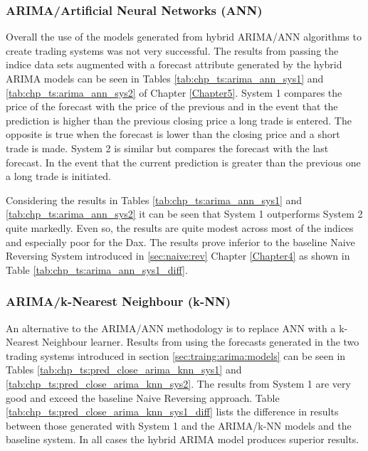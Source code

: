 \subsubsection{ARIMA/Artificial Neural Networks (ANN)}
Overall the use of the models generated from hybrid ARIMA/ANN algorithms to create trading systems was not very successful. The results from passing the indice data sets augmented with a forecast attribute generated by the hybrid ARIMA models can be seen in Tables  \ref{tab:chp_ts:arima_ann_sys1} and \ref{tab:chp_ts:arima_ann_sys2} of Chapter \ref{Chapter5}. System 1 compares the price of the forecast with the price of the previous and in the event that the prediction is higher than the previous closing price a long trade is entered. The opposite is true when the forecast is lower than the closing price and a short trade is made. System 2 is similar but compares the forecast with the last forecast. In the event that the current prediction is greater than the previous one a long trade is initiated.

Considering the results in Tables \ref{tab:chp_ts:arima_ann_sys1} and \ref{tab:chp_ts:arima_ann_sys2} it can be seen that System 1 outperforms System 2 quite markedly. Even so, the results are quite modest across most of the indices and especially poor for the Dax. The results prove inferior to the baseline Naive Reversing System introduced in \ref{sec:naive:rev} Chapter \ref{Chapter4} as shown in Table \ref{tab:chp_ts:arima_ann_sys1_diff}.



\subsubsection{ARIMA/k-Nearest Neighbour (k-NN)}
An alternative to the ARIMA/ANN methodology is to replace ANN with a k-Nearest Neighbour learner. Results from using the forecasts generated in the two trading systems introduced in section \ref{sec:traing:arima:models} can be seen in Tables \ref{tab:chp_ts:pred_close_arima_knn_sys1} and \ref{tab:chp_ts:pred_close_arima_knn_sys2}. The results from System 1 are very good and exceed the baseline Naive Reversing approach. Table \ref{tab:chp_ts:pred_close_arima_knn_sys1_diff} lists the difference in results between those generated with System 1 and the ARIMA/k-NN models and the baseline system. In all cases the hybrid ARIMA model produces superior results.



